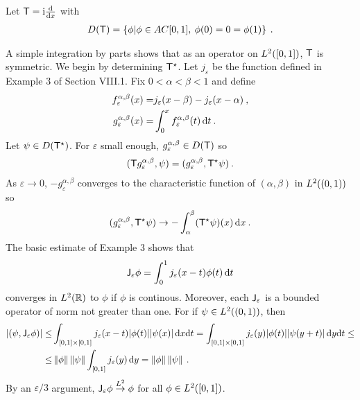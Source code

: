\begin{example}
    Let $\mathsf{T} = \mathrm{i} \frac{\mathrm{d}}{\mathrm{d}x}$ with \begin{align}
        D(\mathsf{T}) = \left \lbrace \phi | \phi \in AC[0,1], \: \phi(0)=0= \phi(1) \right \rbrace \:.
    \end{align}

A simple integration by parts shows that as an operator on $L^{2}([0,1])$, $\mathsf{T}$ is
symmetric. We begin by determining $\mathsf{T}^\star$. Let $j_\varepsilon$ be the function defined in Example 3 of Section VIII.1. Fix $0 <\alpha < \beta <1 $ and define  \begin{align}
    f_\varepsilon^{\alpha, \beta} (x) =& j_\varepsilon(x-\beta) - j_\varepsilon(x - \alpha) \:, \\
    g_\varepsilon^{\alpha, \beta} (x) =& \int_0^x f_\varepsilon^{\alpha, \beta} (t) \, \mathrm{d} t \:.
\end{align}
Let $\psi \in D(\mathsf{T}^\star)$. For $\varepsilon$ small enough, $g_\varepsilon^{\alpha, \beta} \in D(\mathsf{T})$ so \begin{align}
    (\mathsf{T} g_\varepsilon^{\alpha, \beta} , \psi) =(g_\varepsilon^{\alpha, \beta}, \mathsf{T}^\star \psi) \:.
\end{align}
As $\varepsilon \rightarrow 0$, $-g_\varepsilon^{\alpha, \beta}$ converges to the characteristic function of $(\alpha, \beta)$ in $L^{2}((0,1))$ so 
\begin{align}
    (g_\varepsilon^{\alpha, \beta}, \mathsf{T}^\star \psi) \rightarrow - \int_\alpha^\beta (\mathsf{T}^\star \psi)(x) \, \mathrm{d} x \:.
\end{align}
The basic estimate of Example 3 shows that \begin{align}
    \mathsf{J}_\varepsilon \phi = \int_0^1 j_\varepsilon(x-t)\phi(t)\, \mathrm{d} t
\end{align}
converges in $L^{2}(\mathbb{R})$ to $\phi$ if $\phi$ is continous. Moreover, each $\mathsf{J}_\varepsilon$ is a bounded operator of norm not greater than one. For if $\psi \in L^{2}((0,1))$, then \begin{align}
    |(\psi, \mathsf{J}_\varepsilon \phi)| 
    \leq&
     \int_{[0,1]\times [0,1]} j_\varepsilon(x-t) |\phi(t)| |\psi(x)| \, \mathrm{d} x \mathrm{d} t 
    =
     \int_{[0,1]\times [0,1]} j_\varepsilon(y) |\phi(t)| |\psi(y+t)| \, \mathrm{d} y \mathrm{d} t 
     \leq \\ 
     \leq&
      \left \Vert \phi \right \Vert \left \Vert \psi \right \Vert \int_{[0,1]} j_\varepsilon(y) \, \mathrm{d} y 
     =
      \left \Vert \phi \right \Vert \left \Vert \psi \right \Vert \:. \nonumber
\end{align}
By an $\varepsilon/3$ argument, $\mathsf{J}_\varepsilon \phi \overset{L^2}\rightarrow \phi$ for all $\phi \in L^{2}([0,1])$.

\end{example}

